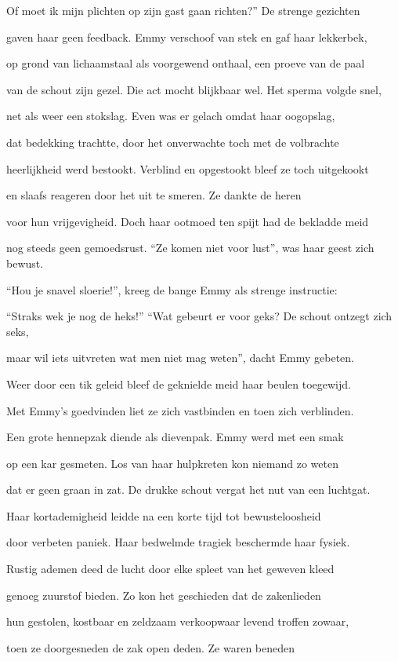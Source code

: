 Of moet ik mijn plichten
op zijn gast gaan richten?”
De strenge gezichten

gaven haar geen feedback.
Emmy verschoof van stek
en gaf haar lekkerbek,

op grond van lichaamstaal
als voorgewend onthaal,
een proeve van de paal

van de schout zijn gezel.
Die act mocht blijkbaar wel.
Het sperma volgde snel,

net als weer een stokslag.
Even was er gelach
omdat haar oogopslag,

dat bedekking trachtte,
door het onverwachte
toch met de volbrachte

heerlijkheid werd bestookt.
Verblind en opgestookt
bleef ze toch uitgekookt

en slaafs reageren
door het uit te smeren.
Ze dankte de heren

voor hun vrijgevigheid.
Doch haar ootmoed ten spijt
had de bekladde meid

nog steeds geen gemoedsrust.
“Ze komen niet voor lust”,
was haar geest zich bewust.

“Hou je snavel sloerie!”,
kreeg de bange Emmy
als strenge instructie:

“Straks wek je nog de heks!”
“Wat gebeurt er voor geks?
De schout ontzegt zich seks,

maar wil iets uitvreten
wat men niet mag weten”,
dacht Emmy gebeten.

Weer door een tik geleid
bleef de geknielde meid
haar beulen toegewijd.

Met Emmy’s goedvinden
liet ze zich vastbinden
en toen zich verblinden.

Een grote hennepzak
diende als dievenpak.
Emmy werd met een smak

op een kar gesmeten.
Los van haar hulpkreten
kon niemand zo weten

dat er geen graan in zat.
De drukke schout vergat
het nut van een luchtgat.

Haar kortademigheid
leidde na een korte tijd
tot bewusteloosheid

door verbeten paniek.
Haar bedwelmde tragiek
beschermde haar fysiek.

Rustig ademen deed
de lucht door elke spleet
van het geweven kleed

genoeg zuurstof bieden.
Zo kon het geschieden
dat de zakenlieden

hun gestolen, kostbaar
en zeldzaam verkoopwaar
levend troffen zowaar,

toen ze doorgesneden
de zak open deden.
Ze waren beneden

